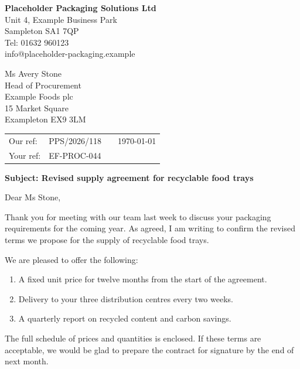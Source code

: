 \documentclass[11pt]{article}
\newcommand{\sendercompany}{Placeholder Packaging Solutions Ltd}
\begin{document}
\hfill
\begin{minipage}[t]{7.4cm}
  \raggedleft
  \textbf{\sendercompany}\\
  Unit 4, Example Business Park\\
  Sampleton SA1 7QP\\
  Tel: 01632 960123\\
  info@placeholder-packaging.example
\end{minipage}

\vspace{1.5em}
\begin{minipage}[t]{7cm}
  Ms Avery Stone\\
  Head of Procurement\\
  Example Foods plc\\
  15 Market Square\\
  Exampleton EX9 3LM
\end{minipage}

\vspace{0.5em}
\begin{tabularx}{\textwidth}{@{}l l X r@{}}
  \small Our ref: & \small PPS/2026/118 & & \today \\
  \small Your ref: & \small EF-PROC-044 & & \\
\end{tabularx}

\textbf{Subject: Revised supply agreement for recyclable food trays}

Dear Ms Stone,

Thank you for meeting with our team last week to discuss your packaging requirements for the coming year. As agreed, I am writing to confirm the revised terms we propose for the supply of recyclable food trays.

We are pleased to offer the following:
\begin{enumerate}
  \item A fixed unit price for twelve months from the start of the agreement.
  \item Delivery to your three distribution centres every two weeks.
  \item A quarterly report on recycled content and carbon savings.
\end{enumerate}

The full schedule of prices and quantities is enclosed. If these terms are acceptable, we would be glad to prepare the contract for signature by the end of next month.
\end{document}
